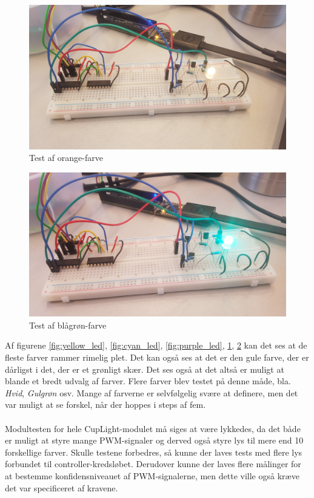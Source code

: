 \documentclass[Modultest/Modultest_main.tex]{subfiles}
\begin{document}
\begin{figure}[H]
    \centering
    \includegraphics[width=\textwidth]{Modultest/CupLight/graphics/color_test4.jpg}
    \caption{Test af orange-farve}
    \label{fig:orange_led}
\end{figure}

\begin{figure}[H]
    \centering
    \includegraphics[width=\textwidth]{Modultest/CupLight/graphics/color_test5.jpg}
    \caption{Test af blågrøn-farve}
    \label{fig:bluegreen_led}
\end{figure}
Af figurene \ref{fig:yellow_led}, \ref{fig:cyan_led}, \ref{fig:purple_led}, \ref{fig:orange_led}, \ref{fig:bluegreen_led} kan det ses at de fleste farver rammer rimelig plet. Det kan også ses at det er den gule farve, der er dårligst i det, der er et grønligt skær. Det ses også at det altså er muligt at blande et bredt udvalg af farver. Flere farver blev testet på denne måde, bla. \textit{Hvid}, \textit{Gulgrøn} osv. Mange af farverne er selvfølgelig svære at definere, men det var muligt at se forskel, når der hoppes i steps af fem.\\\\

Modultesten for hele CupLight-modulet må siges at være lykkedes, da det både er muligt at styre mange PWM-signaler og derved også styre lys til mere end 10 forskellige farver. Skulle testene forbedres, så kunne der laves tests med flere lys forbundet til controller-kredsløbet. Derudover kunne der laves flere målinger for at bestemme konfidensniveauet af PWM-signalerne, men dette ville også kræve det var specificeret af kravene.
\end{document}
